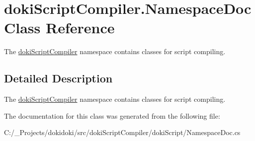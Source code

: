 \hypertarget{classdoki_script_compiler_1_1_namespace_doc}{}\section{doki\+Script\+Compiler.\+Namespace\+Doc Class Reference}
\label{classdoki_script_compiler_1_1_namespace_doc}


The \hyperlink{namespacedoki_script_compiler}{doki\+Script\+Compiler} namespace contains classes for script compiling.  




\subsection{Detailed Description}
The \hyperlink{namespacedoki_script_compiler}{doki\+Script\+Compiler} namespace contains classes for script compiling. 



The documentation for this class was generated from the following file\+:\begin{DoxyCompactItemize}
\item 
C\+:/\+\_\+\+Projects/dokidoki/src/doki\+Script\+Compiler/doki\+Script/Namespace\+Doc.\+cs\end{DoxyCompactItemize}
